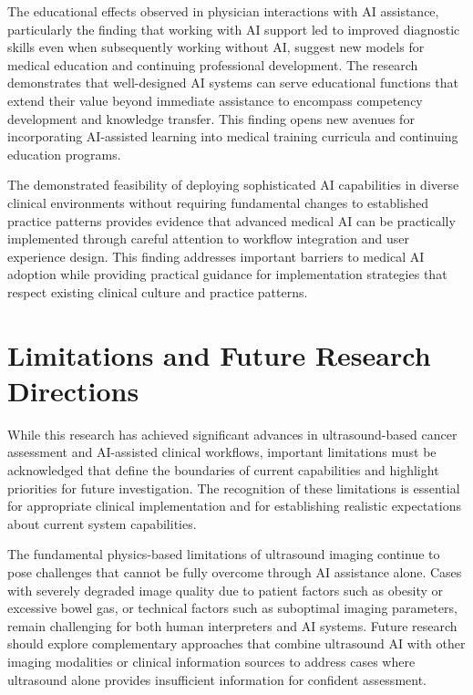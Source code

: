The educational effects observed in physician interactions with AI assistance, particularly the finding that working with AI support led to improved diagnostic skills even when subsequently working without AI, suggest new models for medical education and continuing professional development. The research demonstrates that well-designed AI systems can serve educational functions that extend their value beyond immediate assistance to encompass competency development and knowledge transfer. This finding opens new avenues for incorporating AI-assisted learning into medical training curricula and continuing education programs.

The demonstrated feasibility of deploying sophisticated AI capabilities in diverse clinical environments without requiring fundamental changes to established practice patterns provides evidence that advanced medical AI can be practically implemented through careful attention to workflow integration and user experience design. This finding addresses important barriers to medical AI adoption while providing practical guidance for implementation strategies that respect existing clinical culture and practice patterns.

\section{Limitations and Future Research Directions}

While this research has achieved significant advances in ultrasound-based cancer assessment and AI-assisted clinical workflows, important limitations must be acknowledged that define the boundaries of current capabilities and highlight priorities for future investigation. The recognition of these limitations is essential for appropriate clinical implementation and for establishing realistic expectations about current system capabilities.

The fundamental physics-based limitations of ultrasound imaging continue to pose challenges that cannot be fully overcome through AI assistance alone. Cases with severely degraded image quality due to patient factors such as obesity or excessive bowel gas, or technical factors such as suboptimal imaging parameters, remain challenging for both human interpreters and AI systems. Future research should explore complementary approaches that combine ultrasound AI with other imaging modalities or clinical information sources to address cases where ultrasound alone provides insufficient information for confident assessment.

